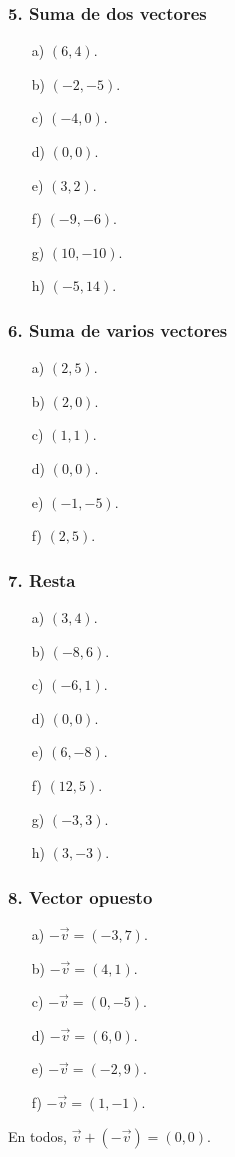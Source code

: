 \subsubsection*{5. Suma de dos vectores}
\begin{enumerate}
    \item[a)] $(6,4)$.
    \item[b)] $(-2,-5)$.
    \item[c)] $(-4,0)$.
    \item[d)] $(0,0)$.
    \item[e)] $(3,2)$.
    \item[f)] $(-9,-6)$.
    \item[g)] $(10,-10)$.
    \item[h)] $(-5,14)$.
\end{enumerate}

\subsubsection*{6. Suma de varios vectores}
\begin{enumerate}
    \item[a)] $(2,5)$.
    \item[b)] $(2,0)$.
    \item[c)] $(1,1)$.
    \item[d)] $(0,0)$.
    \item[e)] $(-1,-5)$.
    \item[f)] $(2,5)$.
\end{enumerate}

\subsubsection*{7. Resta}
\begin{enumerate}
    \item[a)] $(3,4)$.
    \item[b)] $(-8,6)$.
    \item[c)] $(-6,1)$.
    \item[d)] $(0,0)$.
    \item[e)] $(6,-8)$.
    \item[f)] $(12,5)$.
    \item[g)] $(-3,3)$.
    \item[h)] $(3,-3)$.
\end{enumerate}

\subsubsection*{8. Vector opuesto}
\begin{enumerate}
    \item[a)] $-\vec{v}=(-3,7)$.
    \item[b)] $-\vec{v}=(4,1)$.
    \item[c)] $-\vec{v}=(0,-5)$.
    \item[d)] $-\vec{v}=(6,0)$.
    \item[e)] $-\vec{v}=(-2,9)$.
    \item[f)] $-\vec{v}=(1,-1)$.
\end{enumerate}
En todos, $\vec{v}+(-\vec{v})=(0,0)$.

